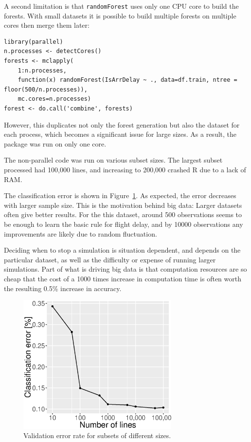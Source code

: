 \documentclass{article}
\begin{document}
A second limitation is that \texttt{randomForest} uses only one CPU core to build the forests. With small datasets it is possible to build multiple forests on multiple cores then merge them later:
\begin{lstlisting}[frame=single, basicstyle=\footnotesize\ttfamily]
library(parallel)
n.processes <- detectCores()
forests <- mclapply(
    1:n.processes,
    function(x) randomForest(IsArrDelay ~ ., data=df.train, ntree = floor(500/n.processes)),
    mc.cores=n.processes)
forest <- do.call('combine', forests)
\end{lstlisting}

However, this duplicates not only the forest generation but also the dataset for each process, which becomes a significant issue for large sizes. As a result, the package was run on only one core.

The non-parallel code was run on various subset sizes. The largest subset processed had 100,000 lines, and increasing to 200,000 crashed R due to a lack of RAM.

The classification error is shown in Figure~\ref{rf_error}. As expected, the error decreases with larger sample size. This is the motivation behind big data: Larger datasets often give better results. For the this dataset, around 500 observations seems to be enough to learn the basic rule for flight delay, and by 10000 observations any improvements are likely due to random fluctuation.

Deciding when to stop a simulation is situation dependent, and depends on the particular dataset, as well as the difficulty or expense of running larger simulations. Part of what is driving big data is that computation resources are so cheap that the cost of a 1000 times increase in computation time is often worth the resulting 0.5\% increase in accuracy.


\begin{figure}[ht]
	\centering
	\includegraphics[height=7cm]{rf_error.eps}
	\caption{\label{rf_error} Validation error rate for subsets of different sizes.}
\end{figure}
\end{document}
